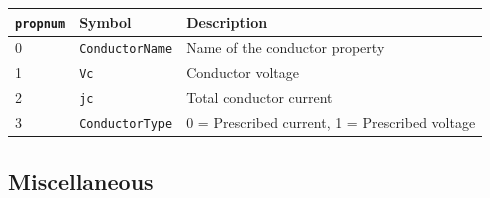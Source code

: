 \begin{itemize}
\begin{tabular}{lll}
\texttt{propnum} & Symbol & Description \\ \hline
  0 & \texttt{ConductorName} & Name of the conductor property \\
  1 & \texttt{Vc} &  Conductor voltage \\
  2 & \texttt{jc} &  Total conductor current \\
  3 & \texttt{ConductorType} & 0 = Prescribed current, 1 = Prescribed voltage
\end{tabular}

\end{itemize}

\subsection{Miscellaneous}


